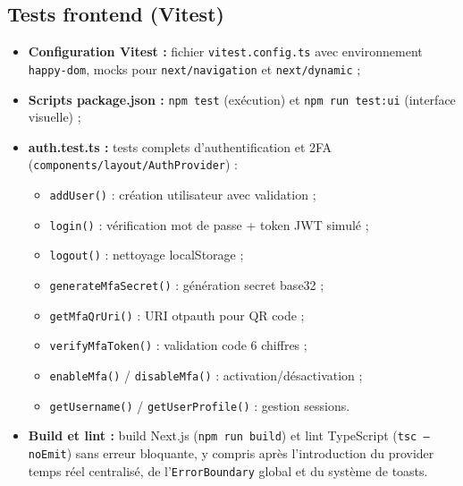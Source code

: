 \documentclass[12pt,a4paper]{report}
\begin{document}
\begin{onehalfspace}
\subsection*{Tests frontend (Vitest)}
\begin{itemize}
  \item[\ding{43}] \textbf{Configuration Vitest :} fichier \texttt{vitest.config.ts}
  avec environnement \texttt{happy-dom}, mocks pour \texttt{next/navigation}
  et \texttt{next/dynamic} ;
  \item[\ding{43}] \textbf{Scripts package.json :} \texttt{npm test} (exécution)
  et \texttt{npm run test:ui} (interface visuelle) ;
  \item[\ding{43}] \textbf{auth.test.ts :} tests complets d'authentification
  et 2FA (\texttt{components/layout/AuthProvider}) :
  \begin{itemize}
    \item \texttt{addUser()} : création utilisateur avec validation ;
    \item \texttt{login()} : vérification mot de passe + token JWT simulé ;
    \item \texttt{logout()} : nettoyage localStorage ;
    \item \texttt{generateMfaSecret()} : génération secret base32 ;
    \item \texttt{getMfaQrUri()} : URI otpauth pour QR code ;
    \item \texttt{verifyMfaToken()} : validation code 6 chiffres ;
    \item \texttt{enableMfa()} / \texttt{disableMfa()} : activation/désactivation ;
    \item \texttt{getUsername()} / \texttt{getUserProfile()} : gestion sessions.
  \end{itemize}
  \item[\ding{43}] \textbf{Build et lint :} build Next.js (\texttt{npm run build})
  et lint TypeScript (\texttt{tsc --noEmit}) sans erreur bloquante,
  y compris après l'introduction du provider temps réel centralisé,
  de l'\texttt{ErrorBoundary} global et du système de toasts.
\end{itemize}
\end{onehalfspace}
\end{document}

